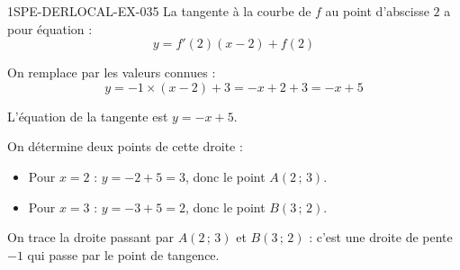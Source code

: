\begin{corrige}{1SPE-DERLOCAL-EX-035}
La tangente à la courbe de $f$ au point d'abscisse $2$ a pour équation :
\[
y = f'(2)(x - 2) + f(2)
\]

On remplace par les valeurs connues :
\[
y = -1 \times (x - 2) + 3 = -x + 2 + 3 = -x + 5
\]

L'équation de la tangente est $y = -x + 5$.

On détermine deux points de cette droite :
\begin{itemize}
\item Pour $x = 2$ : $y = -2 + 5 = 3$, donc le point $A(2\,;\,3)$.
\item Pour $x = 3$ : $y = -3 + 5 = 2$, donc le point $B(3\,;\,2)$.
\end{itemize}

On trace la droite passant par $A(2\,;\,3)$ et $B(3\,;\,2)$ : c'est une droite de pente $-1$ qui passe par le point de tangence.
\end{corrige}
